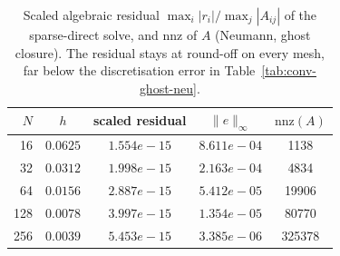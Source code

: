 \begin{table}[H]
\centering\small
\caption{Scaled algebraic residual $\max_i |r_i|/\max_j|A_{ij}|$ of the sparse-direct solve, and nnz of $A$ (Neumann, ghost closure). The residual stays at round-off on every mesh, far below the discretisation error in Table~\ref{tab:conv-ghost-neu}.}
\label{tab:residuals}
\begin{tabular}{rcccc}
\toprule
$N$ & $h$ & scaled residual & $\lVert e\rVert_{\infty}$ & $\mathrm{nnz}(A)$ \\
\midrule
16 & $0.0625$ & $1.554e-15$ & $8.611e-04$ & 1138 \\
32 & $0.0312$ & $1.998e-15$ & $2.163e-04$ & 4834 \\
64 & $0.0156$ & $2.887e-15$ & $5.412e-05$ & 19906 \\
128 & $0.0078$ & $3.997e-15$ & $1.354e-05$ & 80770 \\
256 & $0.0039$ & $5.453e-15$ & $3.385e-06$ & 325378 \\
\bottomrule
\end{tabular}
\end{table}